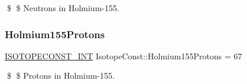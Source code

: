 \$ \$ Neutrons in Holmium-\/155. \mbox{\label{group___isotope_const-_holmium-_ho155_ga743b3027743db0fdd7cd56a86b60f684}} 
\subsubsection{\texorpdfstring{Holmium155\+Protons}{Holmium155Protons}}
{\footnotesize\ttfamily \mbox{\hyperlink{group___isotope_const-_macros_ga5f18360b3e99483a35c32d789e62621c}{I\+S\+O\+T\+O\+P\+E\+C\+O\+N\+S\+T\+\_\+\+I\+NT}} Isotope\+Const\+::\+Holmium155\+Protons = 67}

\$ \$ Protons in Holmium-\/155. 